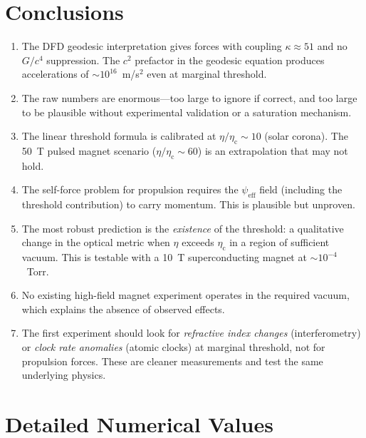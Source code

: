 \documentclass[12pt,a4paper]{article}
\newcommand{\psieff}{\psi_{\mathrm{eff}}}
\newcommand{\etac}{\eta_{\mathrm{c}}}
\begin{document}
\section{Conclusions}
\label{sec:conclusions}

\begin{enumerate}
\item The DFD geodesic interpretation gives forces with coupling $\kappa \approx 51$ and no $G/c^4$
      suppression. The $c^2$ prefactor in the geodesic equation produces accelerations of
      $\sim 10^{16}$~m/s$^2$ even at marginal threshold.

\item The raw numbers are enormous---too large to ignore if correct, and too large to be plausible
      without experimental validation or a saturation mechanism.

\item The linear threshold formula is calibrated at $\eta/\etac \sim 10$ (solar corona). The 50~T
      pulsed magnet scenario ($\eta/\etac \sim 60$) is an extrapolation that may not hold.

\item The self-force problem for propulsion requires the $\psieff$ field (including the threshold
      contribution) to carry momentum. This is plausible but unproven.

\item The most robust prediction is the \emph{existence} of the threshold: a qualitative change in
      the optical metric when $\eta$ exceeds $\etac$ in a region of sufficient vacuum. This is
      testable with a 10~T superconducting magnet at $\sim 10^{-4}$~Torr.

\item No existing high-field magnet experiment operates in the required vacuum, which explains the
      absence of observed effects.

\item The first experiment should look for \emph{refractive index changes} (interferometry) or
      \emph{clock rate anomalies} (atomic clocks) at marginal threshold, not for propulsion forces.
      These are cleaner measurements and test the same underlying physics.
\end{enumerate}

\appendix
\section{Detailed Numerical Values}
\label{app:numbers}
\end{document}
